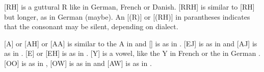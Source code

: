 [RH] is a guttural R like in German, French or Danish. [RRH] is similar to [RH] but longer, as in German  (maybe). An [(R)] or [(RH)] in parantheses indicates that the consonant may be silent, depending on dialect. 

[A] or [AH] or [AA] is similar to the  A in  and [\Aumlaut{}] is as in . 
[EJ] is as in  and [AJ] is as in . 
[E] or [EH] is as in . 
[Y] is a vowel, like the  Y in French  or the  in German . 
[OO] is as in , [OW] is as in  and [AW] is as in . 









